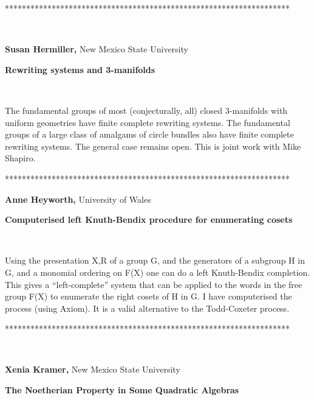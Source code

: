 \documentclass[12pt]{article}
\begin{document}
\begin{center}
*******************************************************************
\end{center}

\vspace{.1in}\ 

\noindent \textbf{Susan Hermiller,} New Mexico State University

\noindent \textbf{Rewriting systems and 3-manifolds}

\smallskip\ 

\noindent The fundamental groups of most (conjecturally, all) closed
3-manifolds with uniform geometries have finite complete rewriting systems.
The fundamental groups of a large class of amalgams of circle bundles also
have finite complete rewriting systems. The general case remains open. This
is joint work with Mike Shapiro.

\begin{center}
*******************************************************************
\end{center}

\noindent \textbf{Anne Heyworth, }University of Wales

\noindent \textbf{Computerised left Knuth-Bendix procedure for enumerating
cosets }

\smallskip\ 

\noindent Using the presentation \TEXTsymbol{<}X,R\TEXTsymbol{>} of a group
G, and the generators of a subgroup H in G, and a monomial ordering on F(X)
one can do a left Knuth-Bendix completion. This gives a ``left-complete''
system that can be applied to the words in the free group F(X) to enumerate
the right cosets of H in G. I have computerised the process (using Axiom).
It is a valid alternative to the Todd-Coxeter process.

\begin{center}
*******************************************************************
\end{center}

\vspace{.1in}\ 

\noindent \textbf{Xenia Kramer,} New Mexico State University

\noindent \textbf{The Noetherian Property in Some Quadratic Algebras }

\smallskip\ 
\end{document}
